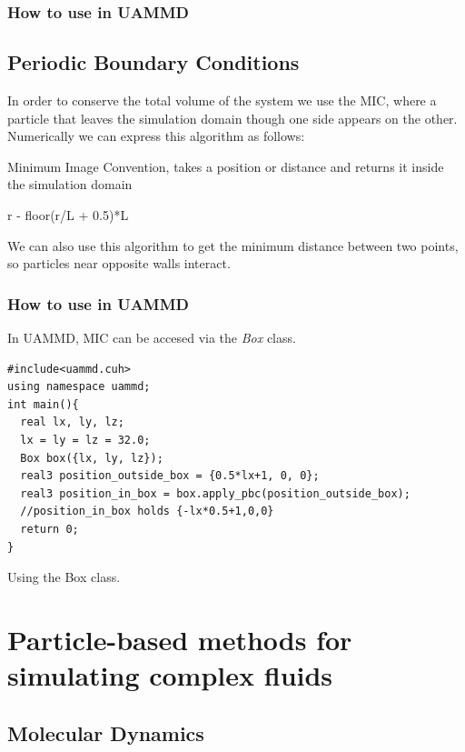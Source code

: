\documentclass[ twoside,openright,titlepage,numbers=noenddot,%
headinclude,footinclude,cleardoublepage=empty,abstract=on,
BCOR=5mm,paper=a4,fontsize=11pt, dvipsnames
]{scrreprt}
\newcommand{\uammd}{\gls{UAMMD}\xspace}
\begin{document}
\subsection{How to use in UAMMD}


\section{Periodic Boundary Conditions}
In order to conserve the total volume of the system we use the \gls{MIC}, where a particle that leaves the simulation domain though one side appears on the other.
Numerically we can express this algorithm as follows:

\begin{algorithm}
  \caption{Minimum Image Convention, takes a position or distance and returns it inside the simulation domain}
  \begin{algorithmic}[1]
    \State \Return r - floor(r/L + 0.5)*L
    \EndFunction
  \end{algorithmic}
\end{algorithm}
We can also use this algorithm to get the minimum distance between two points, so particles near opposite walls interact.
\subsection{How to use in UAMMD}
In \uammd, \gls{MIC} can be accesed via the \emph{Box} class.
\begin{listing}[H]
\begin{verbatim}
#include<uammd.cuh>
using namespace uammd;
int main(){
  real lx, ly, lz;
  lx = ly = lz = 32.0;
  Box box({lx, ly, lz});
  real3 position_outside_box = {0.5*lx+1, 0, 0};
  real3 position_in_box = box.apply_pbc(position_outside_box);
  //position_in_box holds {-lx*0.5+1,0,0}
  return 0; 
}
\end{verbatim}
\caption{Using the Box class.}
\label{code:box}
\end{listing}


\chapter{Particle-based methods for simulating complex fluids}
\section{Molecular Dynamics}\label{sec:md}
\end{document}
